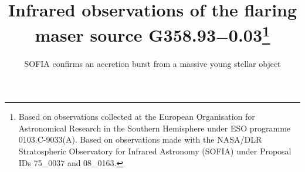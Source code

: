 %

%
\usepackage{natbib,twoopt}
\usepackage{threeparttable}
\usepackage{adjustbox}
\usepackage{rotating}
\usepackage{amsmath}

%
\usepackage{graphicx}
\usepackage{txfonts}



\usepackage[breaklinks=true,colorlinks=true,allcolors=blue,pagebackref=true]{hyperref}

\newcommand{\mypm}{\mathbin{\smash{%
\raisebox{0.65ex}{%
            $\underset{\raisebox{0.05ex}{$\smash -$}}{\smash+}$%
            }%
        }%
    }%
}

\newcommand{\goodchi}{\protect\raisebox{2pt}{$\chi$}}
\newcommand*\red{\color{red}}

 



   \title{Infrared observations of the flaring maser source G358.93$-$0.03\thanks{Based on observations collected at the European Organisation for Astronomical Research in the Southern Hemisphere under ESO programme 0103.C-9033(A). Based on observations made with the NASA/DLR Stratospheric Observatory for Infrared Astronomy (SOFIA) under Proposal IDs 75\_0037 and 08\_0163.}}
   \subtitle{SOFIA confirms an accretion burst from a massive young stellar object
   }

